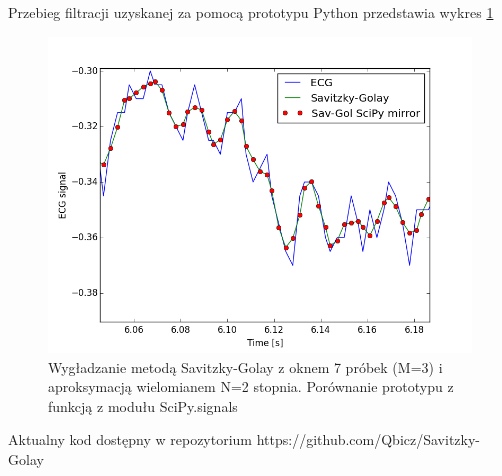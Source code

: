 Przebieg filtracji uzyskanej za pomocą prototypu Python przedstawia wykres \ref{rys:savitzky_py}

\begin{figure}[!htb]
  \begin{center}
    \includegraphics[scale=0.8]
    {img/prototype.png}
  \end{center}
  \caption{Wygładzanie metodą Savitzky-Golay z oknem 7 próbek (M=3) i aproksymacją wielomianem N=2 stopnia. Porównanie prototypu z funkcją z modułu SciPy.signals}
  \label{rys:savitzky_py}
\end{figure}

Aktualny kod dostępny w repozytorium https://github.com/Qbicz/Savitzky-Golay


